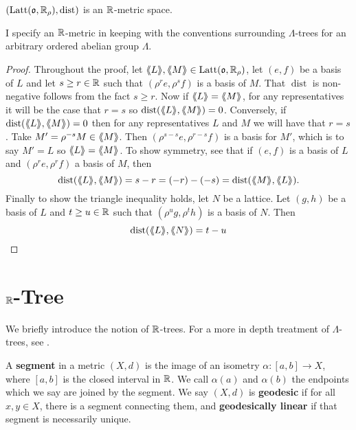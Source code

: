 \documentclass[draft]{amsart}
\DeclareMathOperator{\dist}{dist}
\DeclareMathOperator{\lat}{Latt}
\newcommand{\latt}{\lat(\mathfrak o,\R_\rho)}
\newcommand{\llangle}{\langle \hspace{-.25em}\langle}
\newcommand{\rrangle}{\rangle \hspace{-.25em}\rangle}
\begin{document}
\begin{thm}
    \((\lat(\mathfrak o,\R_\rho),\dist)\) is an \(\mathbb{R}\)-metric space.
\end{thm}
I specify an \(\mathbb{R}\)-metric in keeping with the conventions surrounding \(\Lambda\)-trees for an arbitrary ordered abelian group \(\Lambda\). 
\begin{proof}
    Throughout the proof, let \(\llangle L \rrangle, \llangle M \rrangle \in \latt\), let \((e,f)\) be a basis of \(L\) and let  \(s\ge r\in \mathbb{R}\) such that \((\rho^r e,\rho^s f)\) is a basis of \(M\). That \(\dist\) is non-negative follows from the fact \(s\ge r\). Now if \(\llangle L\rrangle=\llangle M \rrangle\), for any representatives it will be the case that \(r=s\) so \(\dist(\llangle L\rrangle ,\llangle M \rrangle)=0\). Conversely, if \(\dist(\llangle L\rrangle ,\llangle M \rrangle)=0\) then for any representatives  \(L\) and \(M\) we will have that \(r=s\). Take \(M'=\rho^{-s}M \in \llangle M \rrangle \). Then \((\rho^{s-s}e, \rho^{r-s}f)\) is a basis for \(M'\), which is to say \(M'=L\) so \(\llangle L\rrangle = \llangle M \rrangle\). 
    To show symmetry, see that if \((e,f)\) is a basis of \(L\) and \((\rho^r e, \rho^r f)\) a basis of \(M\), then
    \[\dist(\llangle L\rrangle ,\llangle M \rrangle)=s-r=(-r)-(-s)=\dist(\llangle M\rrangle ,\llangle L \rrangle).\]
    Finally to show the triangle inequality holds, let \(N\) be a lattice. Let \((g,h)\) be a basis of \(L\) and \(t\ge u\in \mathbb{R}\) such that \((\rho^u g,\rho^t h)\) is a basis of \(N\). Then
    \[\dist(\llangle L \rrangle , \llangle N \rrangle )=t-u\]
    
    
    
\end{proof}


    
\section{\(\mathbb{R}\)-Tree}

We briefly introduce the notion of \(\mathbb{R}\)-trees. For a more in depth treatment of \(\Lambda\)-trees, see \cite{Chiswell_2001}.

A \textbf{segment} in a metric \((X,d)\) is the image of an isometry \(\alpha:[a,b]\to X\), where \([a,b]\) is the closed interval in \(\mathbb{R}\). We call \(\alpha(a)\) and \(\alpha(b)\) the endpoints which we say are joined by the segment. We say \((X,d)\) is \textbf{geodesic} if for all \(x,y\in X\), there is a segment connecting them, and \textbf{geodesically linear} if that segment is necessarily unique.
\end{document}
